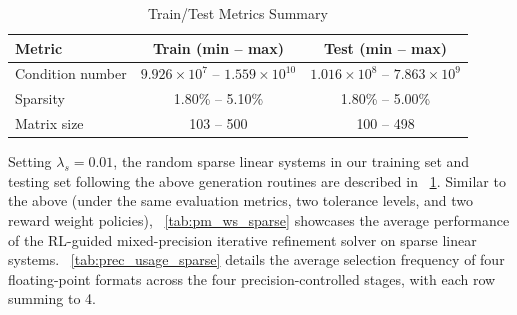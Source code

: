\documentclass[Afour,sageh,times]{sagej}
\theoremstyle{plain}
\theoremstyle{definition}
\begin{document}
\begin{table}[ht!]
\centering\footnotesize
\caption{Train/Test Metrics Summary}\label{tab:sparse_stats}
\begin{tabular}{lcc}
\toprule
\textbf{Metric} & \textbf{Train (min -- max)} & \textbf{Test (min -- max)} \\
\midrule
Condition number & $9.926\times10^{7}$ -- $1.559\times10^{10}$ & $1.016\times10^{8}$ -- $7.863\times10^{9}$ \\
Sparsity          & 1.80\% -- 5.10\% & 1.80\% -- 5.00\% \\
Matrix size      & 103 -- 500 & 100 -- 498 \\
\bottomrule
\end{tabular}
\end{table}


Setting $\lambda_s=0.01$, the random sparse linear systems in our training set and testing set following the above generation routines are described in \tablename~\ref{tab:sparse_stats}. Similar to the above (under the same evaluation metrics, two tolerance levels, and two reward weight policies), \tablename~\ref{tab:pm_ws_sparse} showcases the average performance of the RL-guided mixed-precision iterative refinement solver on sparse linear systems. \tablename~\ref{tab:prec_usage_sparse} details the average selection frequency of four floating-point formats across the four precision-controlled stages, with each row summing to 4.

\end{document}
